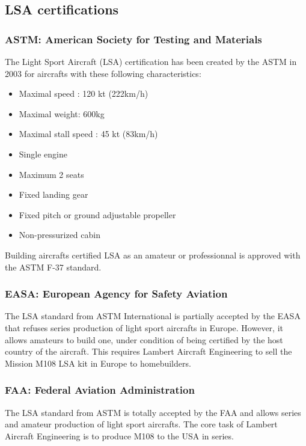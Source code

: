 \documentclass[11pt,a4paper]{article}
\begin{document}
\subsection{LSA certifications}
\label{subsec:certifications}
\subsubsection{ASTM: American Society for Testing and Materials}
The Light Sport Aircraft (LSA) certification has been created by the ASTM in 2003 for aircrafts with these following characteristics:
\begin{itemize}
\setlength{\itemsep}{0pt}
\item Maximal speed : 120 kt (222km/h)
\item Maximal weight: 600kg
\item Maximal stall speed : 45 kt (83km/h)
\item Single engine
\item Maximum 2 seats
\item Fixed landing gear
\item Fixed pitch or ground adjustable propeller
\item Non-pressurized cabin
\end{itemize}

\bigskip

Building aircrafts certified LSA as an amateur or professionnal is approved with the ASTM F-37 standard.

\subsubsection{EASA: European Agency for Safety Aviation}
The LSA standard from ASTM International is partially accepted by the EASA that refuses series production of light sport aircrafts in Europe. However, it allows amateurs to build one, under condition of being certified by the host country of the aircraft. This requires Lambert Aircraft Engineering to sell the Mission M108 LSA kit in Europe to homebuilders.

\subsubsection{FAA: Federal Aviation Administration}
The LSA standard from ASTM is totally accepted by the FAA and allows series and amateur production of light sport aircrafts. The core task of Lambert Aircraft Engineering is to produce M108 to the USA in series.
\end{document}

